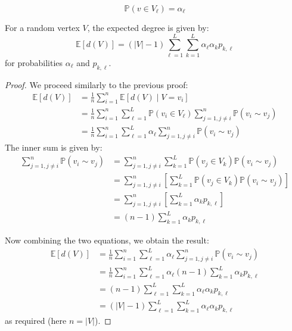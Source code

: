 \documentclass{article}
\begin{document}
\begin{equation*}
    \mathbb{P}(v\in V_{\ell}) = \alpha_{\ell}
\end{equation*}  

\begin{proposition}
    For a random vertex $V$, the expected degree is given by:
    \begin{equation*}
        \mathbb{E}[d(V)] = (|V|-1)\sum_{\ell=1}^{L}\sum_{k=1}^{L}\alpha_{\ell}\alpha_{k}p_{k,\ell}
    \end{equation*}
    for probabilities $\alpha_{\ell}$ and $p_{k,\ell}$.
\end{proposition}

\begin{proof}
    We proceed similarly to the previous proof:
    \begin{align*}
        \mathbb{E}[d(V)] &= \frac{1}{n} \sum_{i=1}^n \mathbb{E}[d(V)\mid V=v_i]\\
        &= \frac{1}{n} \sum_{i=1}^n \sum_{\ell=1}^L \mathbb{P}(v_i \in V_{\ell}) \sum_{j=1, j\neq i}^n \mathbb{P}(v_i \sim v_j)\\
        &= \frac{1}{n} \sum_{i=1}^n \sum_{\ell=1}^L \alpha_\ell \sum_{j=1, j\neq i}^n \mathbb{P}(v_i \sim v_j)
    \end{align*}
    The inner sum is given by:
    \begin{align*}
        \sum_{j=1, j\neq i}^n \mathbb{P}(v_i \sim v_j) &= \sum_{j=1, j\neq i}^n \sum_{k=1}^L \mathbb{P}(v_j \in V_k) \mathbb{P}(v_i \sim v_j)\\
        &= \sum_{j=1, j\neq i}^n \left[\sum_{k=1}^L \mathbb{P}(v_j \in V_k) \mathbb{P}(v_i \sim v_j)\right]\\
        &= \sum_{j=1, j\neq i}^n \left[\sum_{k=1}^L \alpha_k p_{k,\ell}\right]\\
        &= (n-1) \sum_{k=1}^L \alpha_k p_{k,\ell}
    \end{align*}

    Now combining the two equations, we obtain the result:
    \begin{align*}
        \mathbb{E}[d(V)] &=\frac{1}{n} \sum_{i=1}^n \sum_{\ell=1}^L \alpha_\ell \sum_{j=1, j\neq i}^n \mathbb{P}(v_i \sim v_j) \\
        &= \frac{1}{n} \sum_{i=1}^n \sum_{\ell=1}^L \alpha_\ell (n-1) \sum_{k=1}^L \alpha_k p_{k,\ell} \\
        &= (n-1) \sum_{\ell=1}^L \sum_{k=1}^L \alpha_\ell \alpha_k p_{k,\ell} \\
        &= (|V|-1) \sum_{\ell=1}^L \sum_{k=1}^L \alpha_\ell \alpha_k p_{k,\ell}
    \end{align*}
    as required (here $n=|V|$).
\end{proof}
\end{document}
